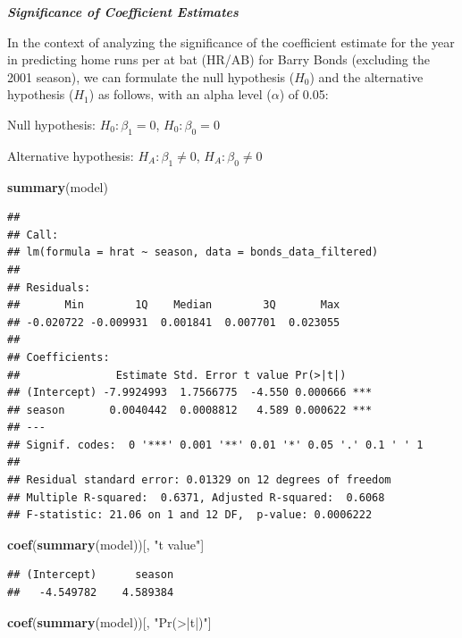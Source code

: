 \documentclass[
]{article}
\newenvironment{Shaded}{\begin{snugshade}}{\end{snugshade}}
\newcommand{\FunctionTok}[1]{\textcolor[rgb]{0.13,0.29,0.53}{\textbf{#1}}}
\newcommand{\NormalTok}[1]{#1}
\newcommand{\StringTok}[1]{\textcolor[rgb]{0.31,0.60,0.02}{#1}}
\begin{document}
\textbf{\emph{Significance of Coefficient Estimates}}

In the context of analyzing the significance of the coefficient estimate
for the year in predicting home runs per at bat (HR/AB) for Barry Bonds
(excluding the 2001 season), we can formulate the null hypothesis
(\(H_0\)) and the alternative hypothesis (\(H_1\)) as follows, with an
alpha level (\(\alpha\)) of 0.05:

Null hypothesis: \(H_{0}: \beta_{1} = 0\), \(H_{0}: \beta_{0} = 0\)

Alternative hypothesis: \(H_{A}: \beta_{1} \neq 0\),
\(H_{A}: \beta_{0} \neq 0\)

\begin{Shaded}
\begin{Highlighting}[]
\FunctionTok{summary}\NormalTok{(model)}
\end{Highlighting}
\end{Shaded}

\begin{verbatim}
## 
## Call:
## lm(formula = hrat ~ season, data = bonds_data_filtered)
## 
## Residuals:
##       Min        1Q    Median        3Q       Max 
## -0.020722 -0.009931  0.001841  0.007701  0.023055 
## 
## Coefficients:
##               Estimate Std. Error t value Pr(>|t|)    
## (Intercept) -7.9924993  1.7566775  -4.550 0.000666 ***
## season       0.0040442  0.0008812   4.589 0.000622 ***
## ---
## Signif. codes:  0 '***' 0.001 '**' 0.01 '*' 0.05 '.' 0.1 ' ' 1
## 
## Residual standard error: 0.01329 on 12 degrees of freedom
## Multiple R-squared:  0.6371, Adjusted R-squared:  0.6068 
## F-statistic: 21.06 on 1 and 12 DF,  p-value: 0.0006222
\end{verbatim}

\begin{Shaded}
\begin{Highlighting}[]
\FunctionTok{coef}\NormalTok{(}\FunctionTok{summary}\NormalTok{(model))[, }\StringTok{"t value"}\NormalTok{]}
\end{Highlighting}
\end{Shaded}

\begin{verbatim}
## (Intercept)      season 
##   -4.549782    4.589384
\end{verbatim}

\begin{Shaded}
\begin{Highlighting}[]
\FunctionTok{coef}\NormalTok{(}\FunctionTok{summary}\NormalTok{(model))[, }\StringTok{"Pr(\textgreater{}|t|)"}\NormalTok{]}
\end{Highlighting}
\end{Shaded}
\end{document}
